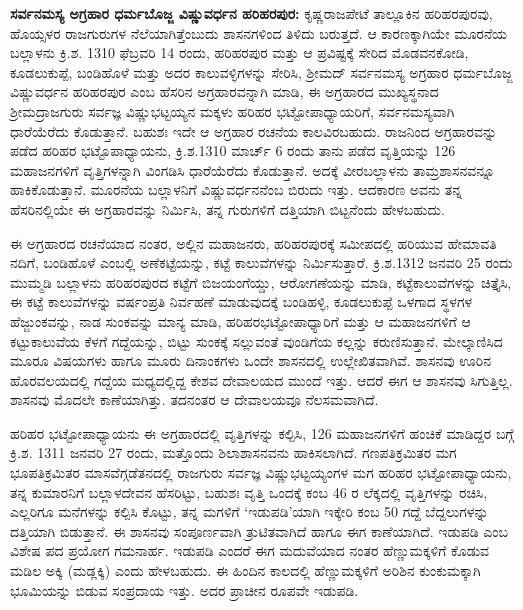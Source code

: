 \textbf{ಸರ್ವನಮಸ್ಯ ಅಗ್ರಹಾರ ಧರ್ಮಬೊಜ್ಜ ವಿಷ್ಣುವರ್ಧನ ಹರಿಹರಪುರ:} ಕೃಷ್ಣರಾಜಪೇಟೆ ತಾಲ್ಲೂಕಿನ ಹರಿಹರಪುರವು, ಹೊಯ್ಸಳರ ರಾಜಗುರುಗಳ ನೆಲೆಯಾಗಿತ್ತೆಂಬುದು ಶಾಸನಗಳಿಂದ ತಿಳಿದು ಬರುತ್ತದೆ. ಆ ಕಾರಣಕ್ಕಾಗಿಯೇ ಮೂರನೆಯ ಬಲ್ಲಾಳನು ಕ್ರಿ.ಶ. 1310 ಫೆಬ್ರವರಿ 14 ರಂದು, ಹರಿಹರಪುರ ಮತ್ತು ಆ ಪ್ರವಿಷ್ಟಕ್ಕೆ ಸೇರಿದ ಮೊಡವನಕೋಡಿ, ಕೂಡಲುಕುಪ್ಪೆ, ಬಂಡಿಹೊಳೆ ಮತ್ತು ಅದರ ಕಾಲುವಳ್ಳಿಗಳನ್ನು ಸೇರಿಸಿ, ಶ‍್ರೀಮದ್​ ಸರ್ವನಮಸ್ಯ ಅಗ್ರಹಾರ ಧರ್ಮಬೊಜ್ಜ ವಿಷ್ಣುವರ್ಧನ ಹರಿಹರಪುರ ಎಂಬ ಹೆಸರಿನ ಅಗ್ರಹಾರವನ್ನಾಗಿ ಮಾಡಿ, ಈ ಅಗ್ರಹಾರದ ಮುಖ್ಯಸ್ಥನಾದ ಶ‍್ರೀಮದ್ರಾಜಗುರು ಸರ್ವಜ್ಞ ವಿಷ್ಣುಭಟ್ಟಯ್ಯನ ಮಕ್ಕಳು ಹರಿಹರ ಭಟ್ಟೋಪಾಧ್ಯಾಯರಿಗೆ, ಸರ್ವನಮಸ್ಯವಾಗಿ ಧಾರೆಯೆರೆದು ಕೊಡುತ್ತಾನೆ. ಬಹುಶಃ ಇದೇ ಆ ಅಗ್ರಹಾರ ರಚನೆಯ ಕಾಲವಿರಬಹುದು. ರಾಜನಿಂದ ಅಗ್ರಹಾರವನ್ನು ಪಡೆದ ಹರಿಹರ ಭಟ್ಟೊಪಾಧ್ಯಾಯನು, ಕ್ರಿ.ಶ.1310 ಮಾರ್ಚ್ 6 ರಂದು ತಾನು ಪಡೆದ ವೃತ್ತಿಯನ್ನು 126 ಮಹಾಜನಗಳಿಗೆ ವೃತ್ತಿಗಳನ್ನಾಗಿ ವಿಂಗಡಿಸಿ ಧಾರೆಯೆರೆದು ಕೊಡುತ್ತಾನೆ. ಅದಕ್ಕೆ ವೀರಬಲ್ಲಾಳನು ತಾಮ್ರಶಾಸನವನ್ನೂ ಹಾಕಿಕೊಡುತ್ತಾನೆ. ಮೂರನೆಯ ಬಲ್ಲಾಳನಿಗೆ ವಿಷ್ಣುವರ್ಧನನೆಂಬ ಬಿರುದು ಇತ್ತು. ಆದಕಾರಣ ಅವನು ತನ್ನ ಹೆಸರಿನಲ್ಲಿಯೇ ಈ ಅಗ್ರಹಾರವನ್ನು ನಿರ್ಮಿಸಿ, ತನ್ನ ಗುರುಗಳಿಗೆ ದತ್ತಿಯಾಗಿ ಬಿಟ್ಟನೆಂದು ಹೇಳಬಹುದು.

ಈ ಅಗ್ರಹಾರದ ರಚನೆಯಾದ ನಂತರ, ಅಲ್ಲಿನ ಮಹಾಜನರು, ಹರಿಹರಪುರಕ್ಕೆ ಸಮೀಪದಲ್ಲಿ ಹರಿಯುವ ಹೇಮಾವತಿ ನದಿಗೆ, ಬಂಡಿಹೊಳೆ ಎಂಬಲ್ಲಿ ಅಣೆಕಟ್ಟೆಯನ್ನು, ಕಟ್ಟೆ ಕಾಲುವೆಗಳನ್ನು ನಿರ್ಮಿಸುತ್ತಾರೆ. ಕ್ರಿ.ಶ.1312 ಜನವರಿ 25 ರಂದು ಮುಮ್ಮಡಿ ಬಲ್ಲಾಳನು ಹರಿಹರಪುರದ ಕಟ್ಟೆಗೆ ಬಿಜಯಂಗೆಯ್ಡು, ಆರೋಗಣೆಯನ್ನು ಮಾಡಿ, ಕಟ್ಟೆಕಾಲುವೆಗಳನ್ನು ಚಿತ್ತೈಸಿ, ಈ ಕಟ್ಟೆ ಕಾಲುವೆಗಳನ್ನು ವರ್ಷಂಪ್ರತಿ ನಿರ್ವಹಣೆ ಮಾಡುವುದಕ್ಕೆ ಬಂಡಿಹಳ್ಳಿ, ಕೂಡಲುಕುಪ್ಪೆ ಒಳಗಾದ ಸ್ಥಳಗಳ ಹೆಜ್ಜುಂಕವನ್ನು, ನಾಡ ಸುಂಕವನ್ನು ಮಾನ್ಯ ಮಾಡಿ, ಹರಿಹರಭಟ್ಟೋಪಾಧ್ಯಾರಿಗೆ ಮತ್ತು ಆ ಮಹಾಜನಗಳಿಗೆ ಆ ಕಟ್ಟುಕಾಲುವೆಯ ಕೆಳಗೆ ಗದ್ದೆಯನ್ನು, ಬಿಟ್ಟು ಸುಂಕಕ್ಕೆ ಸಲ್ಲುವಂತೆ ವುಂಡಿಗೆಯ ಕಲ್ಲನ್ನು ಕರುಣಿಸುತ್ತಾನೆ. ಮೇಲ್ಕಾಣಿಸಿದ ಮೂರೂ ವಿಷಯಗಳು ಹಾಗೂ ಮೂರು ದಿನಾಂಕಗಳು ಒಂದೇ ಶಾಸನದಲ್ಲಿ ಉಲ್ಲೇಖಿತವಾಗಿವೆ. ಶಾಸನವು ಊರಿನ ಹೊರವಲಯದಲ್ಲಿ ಗದ್ದೆಯ ಮಧ್ಯದಲ್ಲಿದ್ದ ಕೇಶವ ದೇವಾಲಯದ ಮುಂದೆ ಇತ್ತು. ಆದರೆ ಈಗ ಆ ಶಾಸನವು ಸಿಗುತ್ತಿಲ್ಲ. ಶಾಸನವು ಮೊದಲೇ ಕಾಣೆಯಾಗಿತ್ತು. ತದನಂತರ ಆ ದೇವಾಲಯವೂ ನೆಲಸಮವಾಗಿದೆ.

\newpage

ಹರಿಹರ ಭಟ್ಟೋಪಾಧ್ಯಾಯನು ಈ ಅಗ್ರಹಾರದಲ್ಲಿ ವೃತ್ತಿಗಳನ್ನು ಕಲ್ಪಿಸಿ, 126 ಮಹಾಜನಗಳಿಗೆ ಹಂಚಿಕೆ ಮಾಡಿದ್ದರ ಬಗ್ಗೆ ಕ್ರಿ.ಶ. 1311 ಜನವರಿ 27 ರಂದು, ಮತ್ತೊಂದು ಶಿಲಾಶಾಸನವನು ಹಾಕಿಸಲಾಗಿದೆ. ಗಣಪತಿಕ್ರಮಿತರ ಮಗ ಭೂಪತಿಕ್ರಮಿತರ ಮಾಸವೆಗ್ಗಡೆತನದಲ್ಲಿ ರಾಜಗುರು ಸರ್ವಜ್ಞ ವಿಷ್ಣುಭಟ್ಟಯ್ಯಂಗಳ ಮಗ ಹರಿಹರ ಭಟ್ಟೋಪಾಧ್ಯಾಯನು, ತನ್ನ ಕುಮಾರನಿಗೆ ಬಲ್ಲಾಳದೇವನ ಹೆಸರಿಟ್ಟು, ಬಹುಶಃ ವೃತ್ತಿ ಒಂದಕ್ಕೆ ಕಂಬ 46 ರ ಲೆಕ್ಕದಲ್ಲಿ ವೃತ್ತಿಗಳನ್ನು ರಚಿಸಿ, ಎಲ್ಲರಿಗೂ ಮನೆಗಳನ್ನು ಕಲ್ಪಿಸಿ ಕೊಟ್ಟು, ತನ್ನ ಮಗಳಿಗೆ ‘ಇಡುಪಡಿ’ಯಾಗಿ ಇಕ್ಕೇರಿ ಕಂಬ 50 ಗದ್ದೆ ಬೆದ್ದಲುಗಳನ್ನು ದತ್ತಿಯಾಗಿ ಬಿಡುತ್ತಾನೆ. ಈ ಶಾಸನವು ಸಂಪೂರ್ಣವಾಗಿ ತ್ರುಟಿತವಾಗಿದೆ ಹಾಗೂ ಈಗ ಕಾಣೆಯಾಗಿದೆ. ಇಡುಪಡಿ ಎಂಬ ವಿಶೇಷ ಪದ ಪ್ರಯೋಗ ಗಮನಾರ್ಹ. ಇಡುಪಡಿ ಎಂದರೆ ಈಗ ಮದುವೆಯಾದ ನಂತರ ಹೆಣ್ಣುಮಕ್ಕಳಿಗೆ ಕೊಡುವ ಮಡಿಲ ಅಕ್ಕಿ (ಮಡ್ಲಕ್ಕಿ) ಎಂದು ಹೇಳಬಹುದು. ಈ ಹಿಂದಿನ ಕಾಲದಲ್ಲಿ ಹೆಣ್ಣುಮಕ್ಕಳಿಗೆ ಅರಿಶಿನ ಕುಂಕುಮಕ್ಕಾಗಿ ಭೂಮಿಯನ್ನು ಬಿಡುವ ಸಂಪ್ರದಾಯ ಇತ್ತು. ಅದರ ಪ್ರಾಚೀನ ರೂಪವೇ ಇಡುಪಡಿ.

